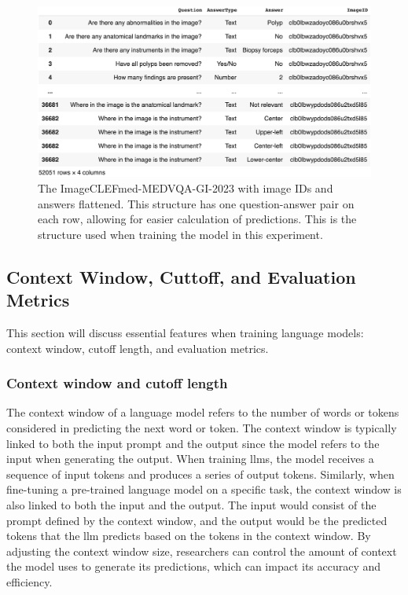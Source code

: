         \begin{figure}[htb]
            \centering
            \centerline{
            \includegraphics[width=1.2\textwidth]{images/colon_vqa_pandas_exploded.png}}
            \caption{The ImageCLEFmed-MEDVQA-GI-2023 with image IDs and answers flattened. This structure has one question-answer pair on each row, allowing for easier calculation of predictions. This is the structure used when training the model in this experiment.}
            \label{fig:colon_vqa_pandas_exploded}
        \end{figure}

        
        
    \subsection{Context Window, Cuttoff, and Evaluation Metrics}
         This section will discuss essential features when training language models: context window, cutoff length, and evaluation metrics. 

        \subsubsection{Context window and cutoff length}
        \label{sec:3_cutoff}
        The context window of a language model refers to the number of words or tokens considered in predicting the next word or token. The context window is typically linked to both the input prompt and the output since the model refers to the input when generating the output. When training \glspl{llm}, the model receives a sequence of input tokens and produces a series of output tokens. 
        Similarly, when fine-tuning a pre-trained language model on a specific task, the context window is also linked to both the input and the output. 
        The input would consist of the prompt defined by the context window, and the output would be the predicted tokens that the \gls{llm} predicts based on the tokens in the context window. 
        By adjusting the context window size, researchers can control the amount of context the model uses to generate its predictions, which can impact its accuracy and efficiency.

